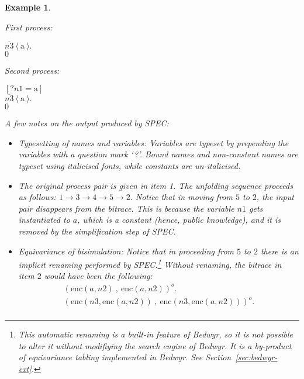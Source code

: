 \documentclass{article}
\newenvironment{example}{\begin{exa} \rm}{\end{exa}}
\newtheorem{exa}[theorem]{Example}
\begin{document}
\begin{example}
\begin{enumerate}
First process: 
\begin{tabbing}$\overline{n3}~\langle ~{\mathrm{a}} ~ \rangle.$ \\ 
$0$ \\ 
\end{tabbing}
Second process: 
\begin{tabbing}${[?n1 = {\mathrm{a}} ]}$ \\ 
$\overline{n3}~\langle ~{\mathrm{a}} ~ \rangle.$ \\ 
$0$ \\ 
\end{tabbing}
\end{enumerate}
A few notes on the output produced by SPEC:
\begin{itemize}
\item {\em Typesetting of names and variables}: 
Variables are typeset by prepending the variables with a question mark `?'. 
Bound names and non-constant names are typeset using italicised fonts, while constants
are un-italicised. 

\item The original process pair is given in item 1. The unfolding sequence
proceeds as follows: $1 \to 3 \to 4 \to 5 \to 2.$ 
Notice that in moving from $5$ to $2$, the input pair disappears from the bitrace.
This is because the variable $n1$ gets instantiated to $a$, which is a constant (hence,
public knowledge), and it is removed by the simplification step of SPEC. 

\item {\em Equivariance of bisimulation}: Notice that in proceeding from $5$ to $2$
there is an implicit renaming performed by SPEC.\footnote{This automatic renaming is
a built-in feature of Bedwyr, so it is not possible to alter it without modifiying
the search engine of Bedwyr. It is a by-product of {\em equivariance tabling} implemented
in Bedwyr. See Section~\ref{sec:bedwyr-ext}.} 
Without renaming, the bitrace in item $2$ would have been the following: 
$$
\begin{array}{l}
(\mbox{enc}(a,n2)~ , ~ \mbox{enc}(a,n2))^o. \\ 
(\mbox{enc}(n3,\mbox{enc}(a,n2))~ , ~ \mbox{enc}(n3,\mbox{enc}(a,n2)))^o. \\ 
\end{array}
$$

\end{itemize}

\end{example}
\end{document}

